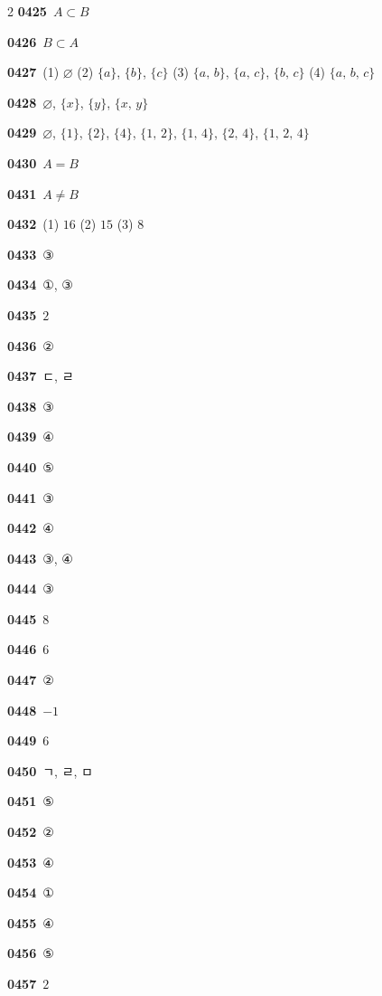 \documentclass[10pt,a4paper]{article}
\begin{document}
\begin{multicols}{2}
\noindent\textbf{0425}\ $A\subset B$\par
\noindent\textbf{0426}\ $B\subset A$\par
\noindent\textbf{0427}\ (1) $\varnothing$ (2) $\{a\}$, $\{b\}$, $\{c\}$ (3) $\{a,\,b\}$, $\{a,\,c\}$, $\{b,\,c\}$ (4) $\{a,\,b,\,c\}$\par
\noindent\textbf{0428}\ $\varnothing$, $\{x\}$, $\{y\}$, $\{x,\,y\}$\par
\noindent\textbf{0429}\ $\varnothing$, $\{1\}$, $\{2\}$, $\{4\}$, $\{1,\,2\}$, $\{1,\,4\}$, $\{2,\,4\}$, $\{1,\,2,\,4\}$\par
\noindent\textbf{0430}\ $A=B$\par
\noindent\textbf{0431}\ $A\ne B$\par
\noindent\textbf{0432}\ (1) $16$ (2) $15$ (3) $8$\par
\noindent\textbf{0433}\ ③\par
\noindent\textbf{0434}\ ①, ③\par
\noindent\textbf{0435}\ $2$\par
\noindent\textbf{0436}\ ②\par
\noindent\textbf{0437}\ ㄷ, ㄹ\par
\noindent\textbf{0438}\ ③\par
\noindent\textbf{0439}\ ④\par
\noindent\textbf{0440}\ ⑤\par
\noindent\textbf{0441}\ ③\par
\noindent\textbf{0442}\ ④\par
\noindent\textbf{0443}\ ③, ④\par
\noindent\textbf{0444}\ ③\par
\noindent\textbf{0445}\ $8$\par
\noindent\textbf{0446}\ $6$\par
\noindent\textbf{0447}\ ②\par
\noindent\textbf{0448}\ $-1$\par
\noindent\textbf{0449}\ $6$\par
\noindent\textbf{0450}\ ㄱ, ㄹ, ㅁ\par
\noindent\textbf{0451}\ ⑤\par
\noindent\textbf{0452}\ ②\par
\noindent\textbf{0453}\ ④\par
\noindent\textbf{0454}\ ①\par
\noindent\textbf{0455}\ ④\par
\noindent\textbf{0456}\ ⑤\par
\noindent\textbf{0457}\ $2$\par

\end{multicols}
\end{document}
